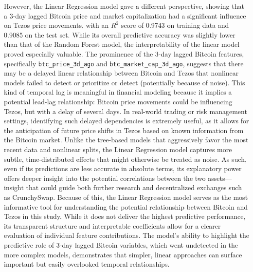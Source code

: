 However, the Linear Regression model gave a different perspective, showing that a 3-day lagged Bitcoin price and market capitalization had a significant influence on Tezos price movements, with an $R^2$ score of 0.9743 on training data and 0.9085 on the test set. 
While its overall predictive accuracy was slightly lower than that of the Random Forest model, the interpretability of the linear model proved especially valuable. 
The prominence of the 3-day lagged Bitcoin features, specifically \texttt{btc\_price\_3d\_ago} and \texttt{btc\_market\_cap\_3d\_ago}, suggests that there may be a delayed linear relationship between Bitcoin and Tezos that nonlinear models failed to detect or prioritize or detect (potentially because of noise).
This kind of temporal lag is meaningful in financial modeling because it implies a potential lead-lag relationship: Bitcoin price movements could be influencing Tezos, but with a delay of several days. In real-world trading or risk management settings, identifying such delayed dependencies is extremely useful, as it allows for the anticipation of future price shifts in Tezos based on known information from the Bitcoin market. 
Unlike the tree-based models that aggressively favor the most recent data and nonlinear splits, the Linear Regression model captures more subtle, time-distributed effects that might otherwise be treated as noise. 
As such, even if its predictions are less accurate in absolute terms, its explanatory power offers deeper insight into the potential correlations between the two assets—insight that could guide both further research and decentralized exchanges such as CrunchySwap.
Because of this, the Linear Regression model serves as the most informative tool for understanding the potential relationship between Bitcoin and Tezos in this study. 
While it does not deliver the highest predictive performance, its transparent structure and interpretable coefficients allow for a clearer evaluation of individual feature contributions. 
The model's ability to highlight the predictive role of 3-day lagged Bitcoin variables, which went undetected in the more complex models, demonstrates that simpler, linear approaches can surface important but easily overlooked temporal relationships. 

